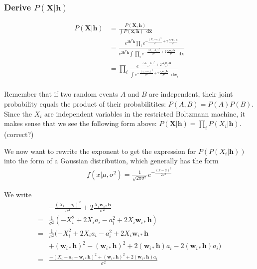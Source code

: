 \documentclass[norsk,a4paper,11pt]{article}
\newcommand*\diff{\mathop{}\!\mathrm{d}}
\newcommand{\VX}{\mathbf{X}}
\newcommand{\Vx}{\mathbf{x}}
\newcommand{\Vh}{\mathbf{h}}
\newcommand{\Vwi}{\mathbf{w}_{i*}}
\newcommand{\Vb}{\mathbf{b}}
\begin{document}
\subsubsection{Derive $P(\VX | \Vh)$}

\begin{align}
	P(\VX | \Vh) &= \frac{P(\VX, \Vh)}{\int P(\Vx, \Vh) \diff \Vx} \\
	&= \frac{e^{2\Vb^T \Vh} \prod_i e^{-\frac{(X_i - a_i)^2}{\sigma^2} + 2\frac{X_i \Vwi \Vh}{\sigma^2}}}{e^{2\Vb^T \Vh} \int \prod_i e^{-\frac{(x_i - a_i)^2}{\sigma^2} + 2\frac{x_i \Vwi \Vh}{\sigma^2}} \diff \Vx } \\
	&= \prod_i \frac{e^{-\frac{(X_i - a_i)^2}{\sigma^2} + 2\frac{X_i \Vwi \Vh}{\sigma^2}}}{\int e^{-\frac{(x_i - a_i)^2}{\sigma^2} + 2\frac{x_i \Vwi \Vh}{\sigma^2}} \diff x_i } \\
\end{align}

Remember that if two random events $A$ and $B$ are independent, their joint probability equals the product of their probabilitites: $P(A, B) = P(A)P(B)$. Since the $X_i$ are independent variables in the restricted Boltzmann machine, it makes sense that we see the following form above: $P(\VX | \Vh) = \prod_i P(X_i | \Vh) $. (correct?)

We now want to rewrite the exponent to get the expression for $P(P(X_i | \Vh))$ into the form of a Gaussian distribution, which generally has the form
\begin{align}
	f(x|\mu, \sigma^2) = \frac{1}{\sqrt{2\pi \sigma^2}} e^{-\frac{(x-\mu)^2}{2\sigma^2}}
\end{align}

We write
\begin{align}
	&-\frac{(X_i - a_i)^2}{\sigma^2} + 2\frac{X_i \Vwi \Vh}{\sigma^2} \\
	= & \frac{1}{\sigma^2}(-X_i^2 + 2X_i a_i - a_i^2 + 2X_i \Vwi \Vh) \\
	= & \frac{1}{\sigma^2}(-X_i^2 + 2X_i a_i - a_i^2 + 2X_i \Vwi  \Vh \\ &+ (\Vwi  \Vh)^2 - (\Vwi \Vh)^2 + 2(\Vwi  \Vh)a_i - 2(\Vwi  \Vh)a_i )\\
	=& \frac{-(X_i - a_i- \Vwi \Vh)^2 + (\Vwi  \Vh)^2 + 2(\Vwi \Vh)a_i}{\sigma^2}
\end{align}
\end{document}
